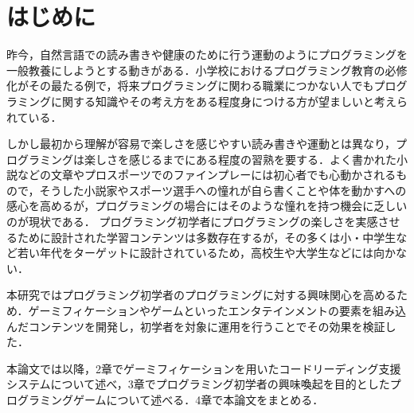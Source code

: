 \section{はじめに}


昨今，自然言語での読み書きや健康のために行う運動のようにプログラミングを一般教養にしようとする動きがある．小学校におけるプログラミング教育の必修化がその最たる例で，将来プログラミングに関わる職業につかない人でもプログラミングに関する知識やその考え方をある程度身につける方が望ましいと考えられている．

しかし最初から理解が容易で楽しさを感じやすい読み書きや運動とは異なり，プログラミングは楽しさを感じるまでにある程度の習熟を要する．よく書かれた小説などの文章やプロスポーツでのファインプレーには初心者でも心動かされるもので，そうした小説家やスポーツ選手への憧れが自ら書くことや体を動かすへの感心を高めるが，プログラミングの場合にはそのような憧れを持つ機会に乏しいのが現状である．
プログラミング初学者にプログラミングの楽しさを実感させるために設計された学習コンテンツは多数存在するが，その多くは小・中学生など若い年代をターゲットに設計されているため，高校生や大学生などには向かない．

本研究ではプログラミング初学者のプログラミングに対する興味関心を高めるため．ゲーミフィケーションやゲームといったエンタテインメントの要素を組み込んだコンテンツを開発し，初学者を対象に運用を行うことでその効果を検証した．

本論文では以降，2章でゲーミフィケーションを用いたコードリーディング支援システムについて述べ，3章でプログラミング初学者の興味喚起を目的としたプログラミングゲームについて述べる．4章で本論文をまとめる．